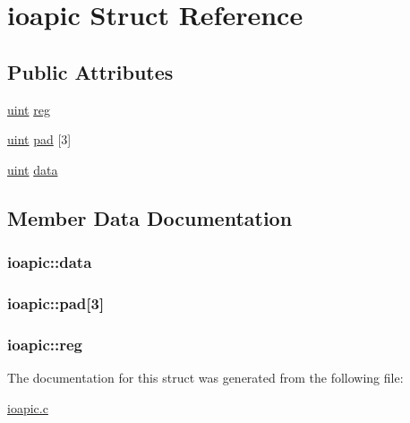 \hypertarget{structioapic}{}\section{ioapic Struct Reference}
\label{structioapic}
\subsection*{Public Attributes}
\begin{DoxyCompactItemize}
\item 
\hyperlink{types_8h_a91ad9478d81a7aaf2593e8d9c3d06a14}{uint} \hyperlink{structioapic_a84bff406f77801bd1574b9cfb8c23ecf}{reg}
\item 
\hyperlink{types_8h_a91ad9478d81a7aaf2593e8d9c3d06a14}{uint} \hyperlink{structioapic_a28ee224d088b53995504eae8cc8fd6ba}{pad} \mbox{[}3\mbox{]}
\item 
\hyperlink{types_8h_a91ad9478d81a7aaf2593e8d9c3d06a14}{uint} \hyperlink{structioapic_a0612c6bb75dc56f0c4c91ad214a02b3a}{data}
\end{DoxyCompactItemize}


\subsection{Member Data Documentation}
\subsubsection[{\texorpdfstring{data}{data}}]{ ioapic\+::data}\hypertarget{structioapic_a0612c6bb75dc56f0c4c91ad214a02b3a}{}\label{structioapic_a0612c6bb75dc56f0c4c91ad214a02b3a}
\subsubsection[{\texorpdfstring{pad}{pad}}]{ ioapic\+::pad\mbox{[}3\mbox{]}}\hypertarget{structioapic_a28ee224d088b53995504eae8cc8fd6ba}{}\label{structioapic_a28ee224d088b53995504eae8cc8fd6ba}
\subsubsection[{\texorpdfstring{reg}{reg}}]{ ioapic\+::reg}\hypertarget{structioapic_a84bff406f77801bd1574b9cfb8c23ecf}{}\label{structioapic_a84bff406f77801bd1574b9cfb8c23ecf}


The documentation for this struct was generated from the following file\+:\begin{DoxyCompactItemize}
\item 
\hyperlink{ioapic_8c}{ioapic.\+c}\end{DoxyCompactItemize}
